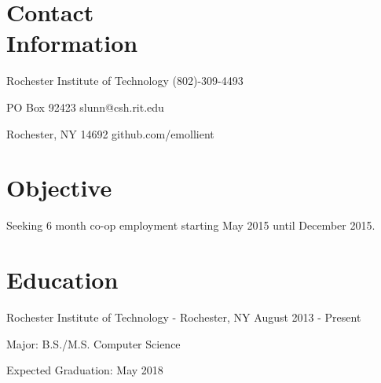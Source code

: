 \documentclass[a4paper,margin,line]{resume}
\newcommand{\rdate}[1]{\hfill {\small #1}}
\begin{document}
\begin{resume}
\section{\mysidestyle Contact \\ Information} \vspace{2mm}
	\begin{asparablank}
		\item Rochester Institute of Technology \hfill (802)-309-4493
		\item PO Box 92423 \hfill slunn@csh.rit.edu
		\item Rochester, NY 14692 \hfill github.com/emollient
	\end{asparablank}

\section{\mysidestyle Objective}
	\begin{asparablank}
    	\item Seeking 6 month co-op employment starting May 2015 until December
        2015.
	\end{asparablank}

\section{\mysidestyle Education}
	\begin{compactdesc}
		\item[Rochester Institute of Technology] - Rochester, NY \rdate{August 2013 - Present}
		\begin{compactitem} { \small
			\item Major: B.S./M.S. Computer Science
		} \end{compactitem}
		\begin{compactitem} { \small
			\item Expected Graduation: May 2018
		} \end{compactitem}
	\end{compactdesc}


\end{resume}
\end{document}
